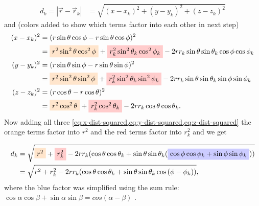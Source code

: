 \begin{align}
    d_k = \left|\vec{r} - \vec{r}_k \right| &= \sqrt{(x-x_k)^2 + (y-y_k)^2 + (z-z_k)^2}
\end{align}
and (colors added to show which terms factor into each other in next step)
\begin{align}
    (x-x_k)^2 &= (r\sin{\theta}\cos{\phi} - r\sin{\theta}\cos{\phi})^2 \notag \\
    &= \tikz[baseline]{
        \node[fill=orange!20,anchor=base]
        {\(r^2\sin^2{\theta}\cos^2{\phi}\)}
    } + \tikz[baseline]{
        \node[fill=red!20,anchor=base]
        {\(r_k^2\sin^2{\theta_k}\cos^2{\phi_k}\)}
    } - 2r r_k \sin{\theta}\sin{\theta_k}\cos{\phi}\cos{\phi_k} \label{eq:x-dist-squared} \\
    (y-y_k)^2 &= (r\sin{\theta}\sin{\phi} - r\sin{\theta}\sin{\phi})^2 \notag \\
    &= \tikz[baseline]{
        \node[fill=orange!20,anchor=base]
        {\(r^2\sin^2{\theta}\sin^2{\phi}\)}
    } + \tikz[baseline]{
        \node[fill=red!20,anchor=base]
        {\(r_k^2\sin^2{\theta_k}\sin^2{\phi_k}\)}
    } - 2r r_k \sin{\theta}\sin{\theta_k}\sin{\phi}\sin{\phi_k} \label{eq:y-dist-squared} \\
    (z-z_k)^2 &= (r\cos{\theta} - r\cos{\theta})^2 \notag \\
    &= \tikz[baseline]{
        \node[fill=orange!20,anchor=base]
        {\(r^2\cos^2{\theta}\)}
    } + \tikz[baseline]{
        \node[fill=red!20,anchor=base]
        {\(r_k^2\cos^2{\theta_k}\)}
    } - 2r r_k \cos{\theta}\cos{\theta_k}. \label{eq:z-dist-squared}
\end{align}
Now adding all three \cref{eq:x-dist-squared,eq:y-dist-squared,eq:z-dist-squared} the orange terms factor into \(r^2\) and the red terms factor into \(r_k^2\) and we get

\begin{align}
    d_k &= \sqrt{
        \tikz[baseline]{\node[fill=orange!20,anchor=base]{\(r^2\)}}
        + \tikz[baseline]{\node[fill=red!20,anchor=base]{\(r_k^2\)}}
        -2r r_k(\cos{\theta}\cos{\theta_k}+\sin{\theta}\sin{\theta_k}(
            \tikz[baseline]{\node[fill=blue!20,anchor=base]{
                \(\cos{\phi}\cos{\phi_k} + \sin{\phi}\sin{\phi_k}\)}}
        ))
    } \\
    &= \sqrt{r^2 + r_k^2 - 2 r r_k(\cos{\theta}\cos{\theta_k}+\sin{\theta}\sin{\theta_k}\cos{(\phi - \phi_k}))},
\end{align}
where the blue factor was simplified using the sum rule: \\
\(\cos{\alpha}\cos{\beta} + \sin{\alpha}\sin{\beta} = cos{(\alpha-\beta)}\) \cite{WeissteinTrig}.

